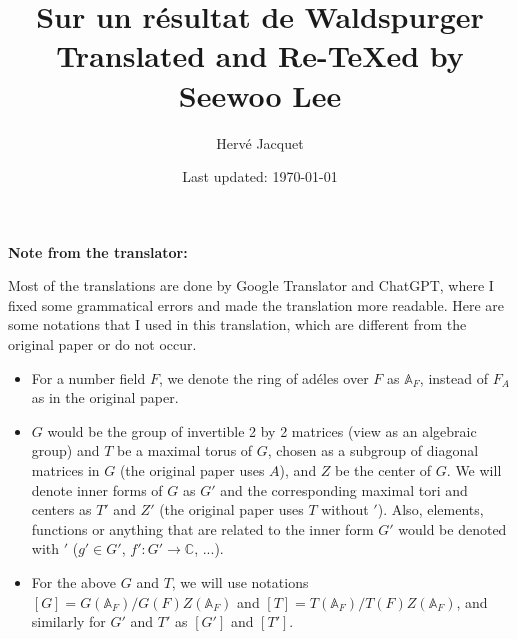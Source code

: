 \documentclass[letterpaper, 12pt]{article}
\newcommand{\1}{\mathds{1}}	%
\newcommand{\Aa}{\mathbb{A}}
\theoremstyle{definition}
\numberwithin{equation}{subsection}
\numberwithin{theorem}{subsection}
\numberwithin{proposition}{section}
\numberwithin{lemma}{section}
\numberwithin{definition}{subsection}
\begin{document}

\title{Sur un r\'esultat de Waldspurger \\[1em]
\normalsize Translated and Re-\TeX ed by Seewoo Lee}


\author{Herv\'e Jacquet}
\date{\normalsize\vspace{-1ex} Last updated: \today}


\maketitle





\tableofcontents

\newpage

\textbf{Note from the translator:} 

Most of the translations are done by Google Translator and ChatGPT, where I fixed some grammatical errors and made the translation more readable.
Here are some notations that I used in this translation, which are different from the original paper or do not occur.

\begin{itemize}
    \item For a number field $F$, we denote the ring of ad\'eles over $F$ as $\Aa_F$, instead of $F_A$ as in the original paper.
    \item $G$ would be the group of invertible 2 by 2 matrices (view as an algebraic group) and $T$ be a maximal torus of $G$, chosen as a subgroup of diagonal matrices in $G$ (the original paper uses $A$), and $Z$ be the center of $G$.
    We will denote inner forms of $G$ as $G'$ and the corresponding maximal tori and centers as $T'$ and $Z'$ (the original paper uses $T$ without $'$).
    Also, elements, functions or anything that are related to the inner form $G'$ would be denoted with $'$ ($g' \in G'$, $f': G' \to \mathbb{C}$, ...).
    \item For the above $G$ and $T$, we will use notations $[G] = G(\Aa_F) / G(F)Z(\Aa_F)$ and $[T] = T(\Aa_F) / T(F) Z(\Aa_F)$, and similarly for $G'$ and $T'$ as $[G']$ and $[T']$.
\end{itemize}
\end{document}
